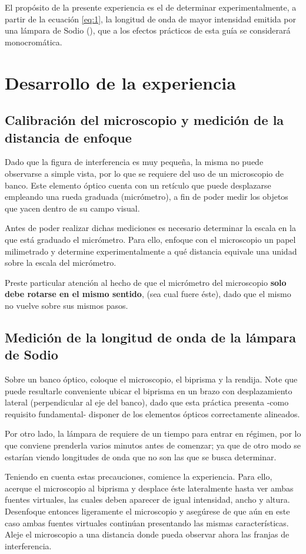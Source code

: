 \documentclass[laboratorio]{guia}
\begin{document}
El propósito de la presente experiencia es el de determinar experimentalmente, a partir de la ecuación \eqref{eq:1}, la longitud de onda de mayor intensidad emitida por una lámpara de Sodio (), que a los efectos prácticos de esta guía se considerará monocromática.


\section{Desarrollo de la experiencia}

\subsection{Calibración del microscopio y medición de la distancia de enfoque}

Dado que la figura de interferencia es muy pequeña, la misma no puede observarse a simple vista, por lo que se requiere del uso de un microscopio de banco.
Este elemento óptico cuenta con un retículo que puede desplazarse empleando una rueda graduada (micrómetro), a fin de poder medir los objetos que yacen dentro de su campo visual.

Antes de poder realizar dichas mediciones es necesario determinar la escala en la que está graduado el micrómetro. Para ello, enfoque con el microscopio un papel milimetrado y determine experimentalmente a qué distancia equivale una unidad sobre la escala del micrómetro.

Preste particular atención al hecho de que el micrómetro del microscopio \textbf{solo debe rotarse en el mismo sentido}, (sea cual fuere éste), dado que el mismo no vuelve sobre sus mismos pasos. 


\subsection{Medición de la longitud de onda de la lámpara de Sodio}

Sobre un banco óptico, coloque el microscopio, el biprisma y la rendija.
Note que puede resultarle conveniente ubicar el biprisma en un brazo con desplazamiento lateral (perpendicular al eje del banco), dado que esta práctica presenta -como requisito fundamental- disponer de los elementos ópticos correctamente alineados. 

Por otro lado, la lámpara de  requiere de un tiempo para entrar en régimen, por lo que conviene prenderla varios minutos antes de comenzar; ya que de otro modo se estarían viendo longitudes de onda que no son las que se busca determinar.

Teniendo en cuenta estas precauciones, comience la experiencia.
Para ello, acerque el microscopio al biprisma y desplace éste lateralmente hasta ver ambas fuentes virtuales, las cuales deben aparecer de igual intensidad, ancho y altura.
Desenfoque entonces ligeramente el microscopio y asegúrese de que aún en este caso ambas fuentes virtuales continúan presentando las mismas características.
Aleje el microscopio a una distancia donde pueda observar ahora las franjas de interferencia.


\nocite{Alonso1998,Jenkins2001,Hecht1986}
 

        
\end{document}
